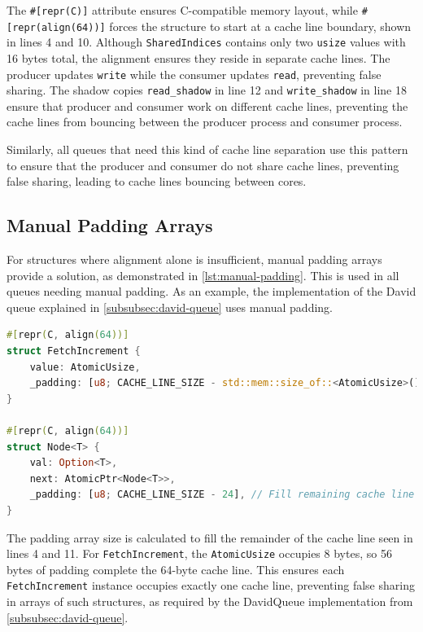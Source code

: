 The \texttt{\#[repr(C)]} attribute ensures C-compatible memory layout, while \newline \texttt{\#[repr(align(64))]} forces the structure to start at a cache line boundary, shown in lines 4 and 10. Although \texttt{SharedIndices} contains only two \texttt{usize} values with 16 bytes total, the alignment ensures they reside in separate cache lines. The producer updates \texttt{write} while the consumer updates \texttt{read}, preventing false sharing. The shadow copies \texttt{read\_shadow} in line 12 and \texttt{write\_shadow} in line 18 ensure that producer and consumer work on different cache lines, preventing the cache lines from bouncing between the producer process and consumer process.

Similarly, all queues that need this kind of cache line separation use this pattern to ensure that the producer and consumer do not share cache lines, preventing false sharing, leading to cache lines bouncing between cores.

\subsection{Manual Padding Arrays}

For structures where alignment alone is insufficient, manual padding arrays provide a solution, as demonstrated in \cref{lst:manual-padding}. This is used in all queues needing manual padding. As an example, the implementation of the David queue explained in \cref{subsubsec:david-queue} uses manual padding.

\begin{lstlisting}[language=Rust, style=boxed, caption={Manual padding for exact cache line control}, label={lst:manual-padding}]
#[repr(C, align(64))]
struct FetchIncrement {
    value: AtomicUsize,
    _padding: [u8; CACHE_LINE_SIZE - std::mem::size_of::<AtomicUsize>()],
}

#[repr(C, align(64))]
struct Node<T> {
    val: Option<T>,
    next: AtomicPtr<Node<T>>,
    _padding: [u8; CACHE_LINE_SIZE - 24], // Fill remaining cache line
}
\end{lstlisting}

The padding array size is calculated to fill the remainder of the cache line seen in lines 4 and 11. For \texttt{FetchIncrement}, the \texttt{AtomicUsize} occupies 8 bytes, so 56 bytes of padding complete the 64-byte cache line. This ensures each \texttt{FetchIncrement} instance occupies exactly one cache line, preventing false sharing in arrays of such structures, as required by the DavidQueue implementation from \cref{subsubsec:david-queue}.

